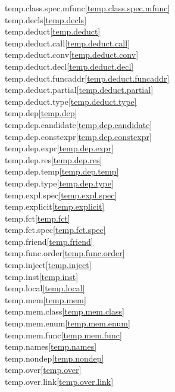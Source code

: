 \begin{multicols}{2}
temp.class.spec.mfunc\quad\ref{temp.class.spec.mfunc}\\
temp.decls\quad\ref{temp.decls}\\
temp.deduct\quad\ref{temp.deduct}\\
temp.deduct.call\quad\ref{temp.deduct.call}\\
temp.deduct.conv\quad\ref{temp.deduct.conv}\\
temp.deduct.decl\quad\ref{temp.deduct.decl}\\
temp.deduct.funcaddr\quad\ref{temp.deduct.funcaddr}\\
temp.deduct.partial\quad\ref{temp.deduct.partial}\\
temp.deduct.type\quad\ref{temp.deduct.type}\\
temp.dep\quad\ref{temp.dep}\\
temp.dep.candidate\quad\ref{temp.dep.candidate}\\
temp.dep.constexpr\quad\ref{temp.dep.constexpr}\\
temp.dep.expr\quad\ref{temp.dep.expr}\\
temp.dep.res\quad\ref{temp.dep.res}\\
temp.dep.temp\quad\ref{temp.dep.temp}\\
temp.dep.type\quad\ref{temp.dep.type}\\
temp.expl.spec\quad\ref{temp.expl.spec}\\
temp.explicit\quad\ref{temp.explicit}\\
temp.fct\quad\ref{temp.fct}\\
temp.fct.spec\quad\ref{temp.fct.spec}\\
temp.friend\quad\ref{temp.friend}\\
temp.func.order\quad\ref{temp.func.order}\\
temp.inject\quad\ref{temp.inject}\\
temp.inst\quad\ref{temp.inst}\\
temp.local\quad\ref{temp.local}\\
temp.mem\quad\ref{temp.mem}\\
temp.mem.class\quad\ref{temp.mem.class}\\
temp.mem.enum\quad\ref{temp.mem.enum}\\
temp.mem.func\quad\ref{temp.mem.func}\\
temp.names\quad\ref{temp.names}\\
temp.nondep\quad\ref{temp.nondep}\\
temp.over\quad\ref{temp.over}\\
temp.over.link\quad\ref{temp.over.link}\\

\end{multicols}
